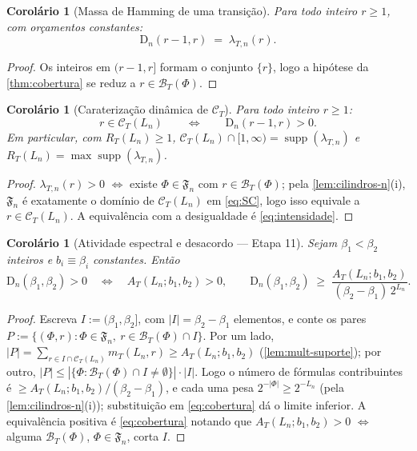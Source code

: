 \documentclass[11pt,a4paper]{article}
\newtheorem{corollary}[theorem]{Corolário}
\theoremstyle{definition}
\theoremstyle{remark}
\begin{document}
\begin{corollary}[Massa de Hamming de uma transição]\label{cor:intensidade}
Para todo inteiro $r \geq 1$, com orçamentos constantes:
\begin{equation}\label{eq:intensidade}
  \mathrm{D}_n(r-1, r) \;=\; \lambda_{T,n}(r).
\end{equation}
\end{corollary}

\begin{proof}
Os inteiros em $(r-1, r]$ formam o conjunto $\{r\}$, logo a hipótese
da \cref{thm:cobertura} se reduz a $r \in \mathcal{B}_T(\Phi)$.
\end{proof}

\begin{corollary}[Caraterização dinâmica de $\mathcal{C}_T$]\label{cor:suporte-dinamico}
Para todo inteiro $r \geq 1$:
\begin{equation}\label{eq:suporte-dinamico}
  r \in \mathcal{C}_T(L_n)
  \qquad\iff\qquad
  \mathrm{D}_n(r-1, r) > 0 .
\end{equation}
Em particular, com $R_T(L_n) \geq 1$,
$\mathcal{C}_T(L_n) \cap [1,\infty) = \operatorname{supp}(\lambda_{T,n})$
e $R_T(L_n) = \max \operatorname{supp}(\lambda_{T,n})$.
\end{corollary}

\begin{proof}
$\lambda_{T,n}(r) > 0$ $\iff$ existe $\Phi \in \mathfrak{F}_n$ com
$r \in \mathcal{B}_T(\Phi)$; pela \cref{lem:cilindros-n}(i),
$\mathfrak{F}_n$ é exatamente o domínio de $\mathcal{C}_T(L_n)$ em
\eqref{eq:SC}, logo isso equivale a $r \in \mathcal{C}_T(L_n)$. A
equivalência com a desigualdade é \eqref{eq:intensidade}.
\end{proof}

\begin{corollary}[Atividade espectral e desacordo --- Etapa 11]\label{cor:atividade}
Sejam $\beta_1 < \beta_2$ inteiros e $b_i \equiv \beta_i$ constantes.
Então
\begin{equation}\label{eq:atividade-disagree}
  \mathrm{D}_n(\beta_1, \beta_2) > 0
  \quad\iff\quad
  A_T(L_n; b_1, b_2) > 0,
  \qquad
  \mathrm{D}_n(\beta_1, \beta_2)
  \;\geq\; \frac{A_T(L_n; b_1, b_2)}{(\beta_2 - \beta_1)\, 2^{L_n}} .
\end{equation}
\end{corollary}

\begin{proof}
Escreva $I := (\beta_1, \beta_2]$, com $|I| = \beta_2 - \beta_1$
elementos, e conte os pares $P := \{(\Phi, r) : \Phi \in
\mathfrak{F}_n,\ r \in \mathcal{B}_T(\Phi) \cap I\}$. Por um lado,
$|P| = \sum_{r \in I \cap \mathcal{C}_T(L_n)} m_T(L_n, r) \geq
A_T(L_n; b_1, b_2)$ (\cref{lem:mult-suporte}); por outro, $|P| \leq
|\{\Phi : \mathcal{B}_T(\Phi) \cap I \neq \emptyset\}| \cdot |I|$.
Logo o número de fórmulas contribuintes é $\geq A_T(L_n; b_1, b_2) /
(\beta_2 - \beta_1)$, e cada uma pesa $2^{-|\Phi|} \geq 2^{-L_n}$
(pela \cref{lem:cilindros-n}(i)); substituição em \eqref{eq:cobertura}
dá o limite inferior. A equivalência positiva é \eqref{eq:cobertura}
notando que $A_T(L_n; b_1, b_2) > 0$ $\iff$ alguma
$\mathcal{B}_T(\Phi)$, $\Phi \in \mathfrak{F}_n$, corta $I$.
\end{proof}
\end{document}
